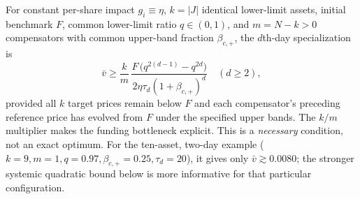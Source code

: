 \documentclass[11pt]{article}
\numberwithin{equation}{section}
\theoremstyle{definition}
\theoremstyle{remark}
\begin{document}
For constant per-share impact $g_i\equiv\eta$, $k=|J|$ identical lower-limit assets, initial benchmark $F$, common lower-limit ratio $q\in(0,1)$, and $m=N-k>0$ compensators with common upper-band fraction $\beta_{c,+}$, the $d$th-day specialization is
\begin{equation}\label{eq:cut-special}
\boxed{\bar v\ge \frac{k}{m}\,
\frac{F\,\big(q^{2(d-1)}-q^{2d}\big)}{2\eta\tau_d(1+\beta_{c,+})^{d}}\quad(d\ge2),}
\end{equation}
provided all $k$ target prices remain below $F$ and each compensator's preceding reference price has evolved from $F$ under the specified upper bands. The $k/m$ multiplier makes the funding bottleneck explicit. This is a \emph{necessary} condition, not an exact optimum. For the ten-asset, two-day example ($k=9,m=1,q=0.97,\beta_{c,+}=0.25,\tau_d=20$), it gives only $\bar v\gtrsim 0.0080$; the stronger systemic quadratic bound below is more informative for that particular configuration.
\end{document}
